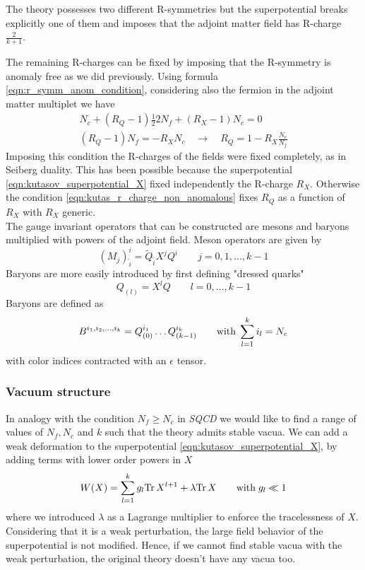 The theory possesses two different R-symmetries but the superpotential breaks explicitly one of them and imposes that the adjoint matter field has R-charge $\frac{2}{k+1}$.

The remaining R-charges can be fixed by imposing that the R-symmetry is anomaly free as we did previously.
Using formula \eqref{eqn:r_symm_anom_condition}, considering also the fermion in the adjoint matter multiplet we have
\begin{equation}
\begin{aligned}
N_c + (R_Q -1) \frac{1}{2} 2 N_f + (R_X - 1 ) N_c = 0 
\label{eqn:kutas_r_charge_non_anomalous}
\\
(R_Q - 1 ) N_f = - R_X N_c \quad \longrightarrow \quad R_Q = 1 - R_X \frac{N_c}{N_f}
\end{aligned}
\end{equation}
Imposing this condition the R-charges of the fields were fixed completely, as in Seiberg duality.
This has been possible because the superpotential 
\eqref{eqn:kutasov_superpotential_X}
fixed independently the R-charge $R_X$.
Otherwise the condition \eqref{eqn:kutas_r_charge_non_anomalous} fixes $R_Q$ as a function of $R_X$ with $R_X$ generic.
\\
The gauge invariant operators that can be constructed are mesons and baryons multiplied with powers of the adjoint field.
Meson operators are given by
\begin{equation}
 (M_j)^i_{\tilde{i}} = \tilde{Q}_{\tilde{i}} X^{j} Q^i \qquad j = 0,1,\dotsc,k-1
\end{equation}
Baryons are more easily introduced by first defining "dressed quarks"
\begin{equation}
 Q_{(l)} = X^{l} Q \qquad l =0, \dotsc, k-1
\end{equation}
Baryons are defined as
\begin{equation}
B^{i_1, i_2, \dotsc , i_k} = Q_{(0)}^{i_1} \dots Q_{(k-1)}^{i_k} \qquad \hbox{with} \; \sum_{l=1}^k i_l = N_c 
\end{equation}
with color indices contracted with an $\epsilon$ tensor.


\subsubsection{Vacuum structure}
\label{sec:kutasov_vacuum_struct_deformed}
In analogy with the condition $N_f \geq N_c$ in \emph{SQCD} we would like to find a range of values of $N_f,N_c$ and $k$ such that the theory admits stable vacua.  
We can add a weak deformation to the superpotential \eqref{eqn:kutasov_superpotential_X}, by adding terms with lower order powers in $X$
\begin{equation}
W(X) = \sum_{l=1}^k g_l  \mathrm{Tr } \, X^{l+1} + \lambda \mathrm{Tr } \, X \qquad \hbox{with} \; g_l \ll 1
\label{eqn:kutasov_deformed_superpotential}
\end{equation}
where we introduced $\lambda$ as a Lagrange multiplier to enforce the tracelessness of $X$.
Considering that it is a weak perturbation, the large field behavior of the superpotential is not modified.
Hence, if we cannot find stable vacua with the weak perturbation, the original theory doesn't have any vacua too. 

